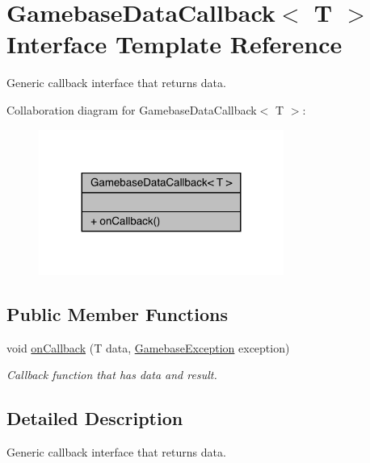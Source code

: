 \hypertarget{interfacecom_1_1toast_1_1android_1_1gamebase_1_1_gamebase_data_callback}{}\section{Gamebase\+Data\+Callback$<$ T $>$ Interface Template Reference}
\label{interfacecom_1_1toast_1_1android_1_1gamebase_1_1_gamebase_data_callback}


Generic callback interface that returns data.  




Collaboration diagram for Gamebase\+Data\+Callback$<$ T $>$\+:
\nopagebreak
\begin{figure}[H]
\begin{center}
\leavevmode
\includegraphics[width=227pt]{interfacecom_1_1toast_1_1android_1_1gamebase_1_1_gamebase_data_callback__coll__graph}
\end{center}
\end{figure}
\subsection*{Public Member Functions}
\begin{DoxyCompactItemize}
\item 
void \hyperlink{interfacecom_1_1toast_1_1android_1_1gamebase_1_1_gamebase_data_callback_a6898f6f2398c6b6f84a4de7fca381e61}{on\+Callback} (T data, \hyperlink{classcom_1_1toast_1_1android_1_1gamebase_1_1base_1_1_gamebase_exception}{Gamebase\+Exception} exception)
\begin{DoxyCompactList}\small\item\em Callback function that has data and result. \end{DoxyCompactList}\end{DoxyCompactItemize}


\subsection{Detailed Description}
Generic callback interface that returns data. 

